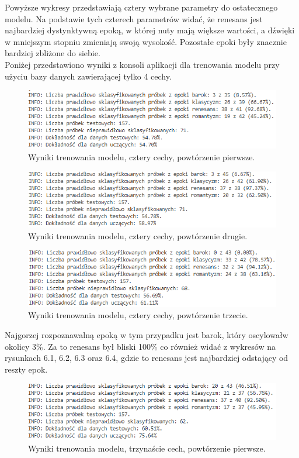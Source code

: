 \documentclass[printmode, eng, openany]{mgr}
\newcommand\tab[1][1cm]{\hspace*{#1}}
\begin{document}
\tab Powyższe wykresy przedstawiają cztery wybrane parametry do ostatecznego modelu. Na podstawie tych czterech parametrów widać, że renesans jest najbardziej dystynktywną epoką, w której nuty mają większe wartości, a dźwięki w mniejszym stopniu zmieniają swoją wysokość. Pozostałe epoki były znacznie bardziej zbliżone do siebie.\\
\tab Poniżej przedstawiono wyniki z konsoli aplikacji dla trenowania modelu przy użyciu bazy danych zawierającej tylko 4 cechy.
\begin{figure}[H]
\centering
\includegraphics[scale=0.9]{wyniki_smaller_0.png}
\caption{Wyniki trenowania modelu, cztery cechy, powtórzenie pierwsze.}
\end{figure}
\begin{figure}[H]
\centering
\includegraphics[scale=0.9]{wyniki_smaller_1.png}
\caption{Wyniki trenowania modelu, cztery cechy, powtórzenie drugie.}
\end{figure}
\begin{figure}[H]
\centering
\includegraphics[scale=0.9]{wyniki_smaller_2.png}
\caption{Wyniki trenowania modelu, cztery cechy, powtórzenie trzecie.}
\end{figure}
\tab Najgorzej rozpoznawalną epoką w tym przypadku jest barok, który oscylował\linebreak w okolicy 3\%. Za to renesans był bliski 100\% co również widać z wykresów na rysunkach 6.1, 6.2, 6.3 oraz 6.4, gdzie to renesans jest najbardziej odstający od reszty epok.
\begin{figure}[H]
\centering
\includegraphics[scale=0.9]{wyniki_small_0.png}
\caption{Wyniki trenowania modelu, trzynaście cech, powtórzenie pierwsze.}
\end{figure}
\end{document}
